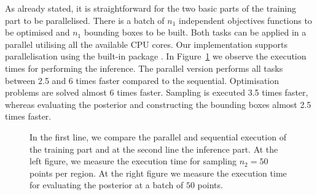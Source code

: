 As already stated, it is straightforward for the two basic parts of
the training part to be parallelised. There is a batch of \(n_1\)
independent objectives functions to be optimised and \(n_1\) bounding
boxes to be built. Both tasks can be applied in a parallel utilising
all the available CPU cores. Our implementation supports
parallelisation using the built-in  package
. In Figure~\ref{fig:exec_parallel} we observe the
execution times for performing the inference. The parallel version
performs all tasks between 2.5 and 6 times faster compared to the
sequential. Optimisation problems are solved almost 6 times
faster. Sampling is executed 3.5 times faster, whereas evaluating the
posterior and constructing the bounding boxes almost 2.5 times faster.

\begin{figure}[ht]
  \begin{center}
    \resizebox{.45\columnwidth}{!}{%
      
    }
    \resizebox{.45\columnwidth}{!}{%
      
    }
    \end{center}
    \caption[Execution time exploiting parallelisation]{In the first
      line, we compare the parallel and sequential execution of the
      training part and at the second line the inference part. At the
      left figure, we measure the execution time for sampling \(n_2=50\)
      points per region. At the right figure we measure the execution
      time for evaluating the posterior at a batch of \(50\) points.}
      \label{fig:exec_parallel}
\end{figure}



